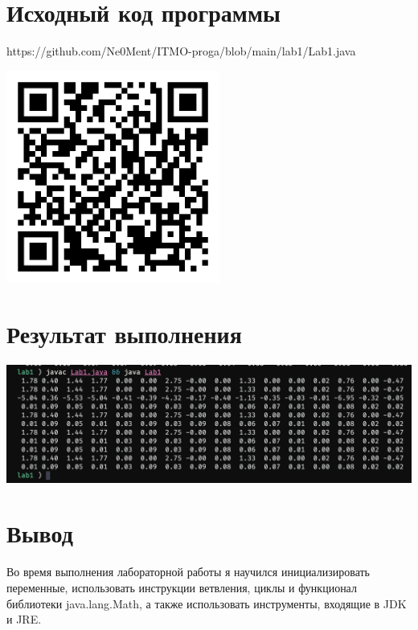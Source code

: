 \documentclass[12pt,onecolumn]{article}
\begin{document}
\section{Исходный код программы}
https://github.com/Ne0Ment/ITMO-proga/blob/main/lab1/Lab1.java
\begin{center}
  \includegraphics[width=7cm]{lab1QR.png}
\end{center}


\section{Результат выполнения}
\includegraphics[width=\columnwidth]{result.png}

\section{Вывод}
Во время выполнения лабораторной работы я научился инициализировать переменные, использовать инструкции ветвления, циклы и функционал библиотеки java.lang.Math, а также использовать инструменты, входящие в JDK и JRE.
\end{document}
